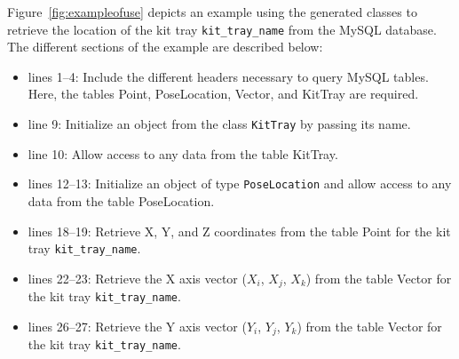 Figure~\ref{fig:exampleofuse} depicts an example using the generated classes to retrieve the location of the kit tray \texttt{kit\_tray\_name} from the MySQL database. The different sections of the example are described below:

\begin{itemize}
\item lines \textcolor{BrickRed}{1--4}: Include the different headers necessary to query MySQL tables. Here, the tables Point, PoseLocation, Vector, and KitTray are required.
\item line \textcolor{BrickRed}{9}: Initialize an object from the class \texttt{KitTray} by passing its name.
\item line \textcolor{BrickRed}{10}: Allow access to any data from the table KitTray.
\item lines \textcolor{BrickRed}{12--13}: Initialize an object of type \texttt{PoseLocation} and allow access to any data from the table PoseLocation.
\item lines \textcolor{BrickRed}{18--19}: Retrieve X, Y, and Z coordinates from the table Point for the kit tray \texttt{kit\_tray\_name}.
\item lines \textcolor{BrickRed}{22--23}: Retrieve the X axis vector ($X_i$, $X_j$, $X_k$) from the table Vector for the kit tray \texttt{kit\_tray\_name}.
\item lines \textcolor{BrickRed}{26--27}: Retrieve the Y axis vector ($Y_i$, $Y_j$, $Y_k$) from the table Vector for the kit tray \texttt{kit\_tray\_name}.
\end{itemize}


